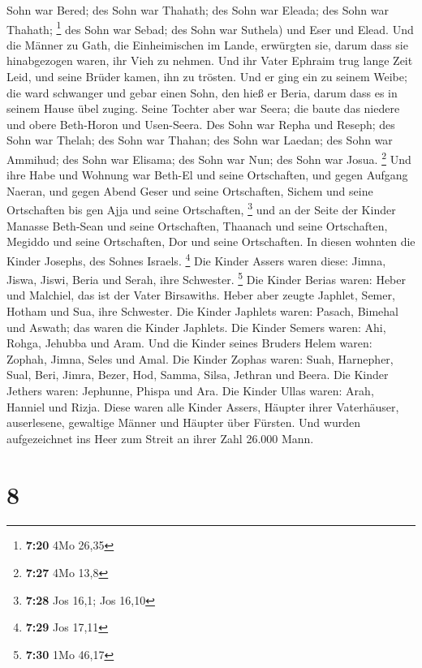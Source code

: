 Sohn war Bered; des Sohn war Thahath; des Sohn war Eleada; des Sohn war
Thahath; \footnote{\textbf{7:20} 4Mo 26,35}  des Sohn war
Sebad; des Sohn war Suthela) und Eser und Elead. Und die Männer zu Gath,
die Einheimischen im Lande, erwürgten sie, darum dass sie hinabgezogen
waren, ihr Vieh zu nehmen.  Und ihr Vater Ephraim trug
lange Zeit Leid, und seine Brüder kamen, ihn zu trösten. 
Und er ging ein zu seinem Weibe; die ward schwanger und gebar einen
Sohn, den hieß er Beria, darum dass es in seinem Hause übel zuging.
 Seine Tochter aber war Seera; die baute das niedere und
obere Beth-Horon und Usen-Seera.  Des Sohn war Repha und
Reseph; des Sohn war Thelah; des Sohn war Thahan;  des
Sohn war Laedan; des Sohn war Ammihud; des Sohn war Elisama;
 des Sohn war Nun; des Sohn war Josua. \footnote{\textbf{7:27}
  4Mo 13,8}  Und ihre Habe und Wohnung war Beth-El und
seine Ortschaften, und gegen Aufgang Naeran, und gegen Abend Geser und
seine Ortschaften, Sichem und seine Ortschaften bis gen Ajja und seine
Ortschaften, \footnote{\textbf{7:28} Jos 16,1; Jos 16,10}
 und an der Seite der Kinder Manasse Beth-Sean und seine
Ortschaften, Thaanach und seine Ortschaften, Megiddo und seine
Ortschaften, Dor und seine Ortschaften. In diesen wohnten die Kinder
Josephs, des Sohnes Israels. \footnote{\textbf{7:29} Jos 17,11}
 Die Kinder Assers waren diese: Jimna, Jiswa, Jiswi,
Beria und Serah, ihre Schwester. \footnote{\textbf{7:30} 1Mo 46,17}
 Die Kinder Berias waren: Heber und Malchiel, das ist der
Vater Birsawiths.  Heber aber zeugte Japhlet, Semer,
Hotham und Sua, ihre Schwester.  Die Kinder Japhlets
waren: Pasach, Bimehal und Aswath; das waren die Kinder Japhlets.
 Die Kinder Semers waren: Ahi, Rohga, Jehubba und Aram.
 Und die Kinder seines Bruders Helem waren: Zophah,
Jimna, Seles und Amal.  Die Kinder Zophas waren: Suah,
Harnepher, Sual, Beri, Jimra,  Bezer, Hod, Samma, Silsa,
Jethran und Beera.  Die Kinder Jethers waren: Jephunne,
Phispa und Ara.  Die Kinder Ullas waren: Arah, Hanniel
und Rizja.  Diese waren alle Kinder Assers, Häupter ihrer
Vaterhäuser, auserlesene, gewaltige Männer und Häupter über Fürsten. Und
wurden aufgezeichnet ins Heer zum Streit an ihrer Zahl 26.000 Mann.

\hypertarget{section-7}{%
\section{8}\label{section-7}}

